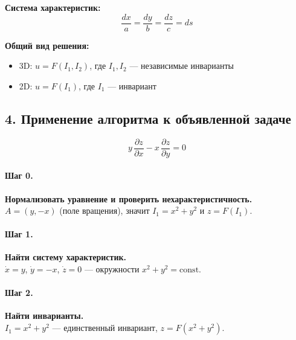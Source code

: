 \textbf{Система характеристик:}
\[
\frac{dx}{a}=\frac{dy}{b}=\frac{dz}{c}=ds
\]

\textbf{Общий вид решения:}
\begin{itemize}
\item 3D: \(u=F(I_1,I_2)\), где \(I_1,I_2\) — независимые инварианты
\item 2D: \(u=F(I_1)\), где \(I_1\) — инвариант
\end{itemize}

\subsection*{4. Применение алгоритма к объявленной задаче}

\[
y\,\frac{\partial z}{\partial x}-x\,\frac{\partial z}{\partial y}=0
\]

\paragraph{Шаг 0.} \textbf{Нормализовать уравнение и проверить нехарактеристичность.}\\
\(A=(y,-x)\) (поле вращения), значит \(I_1=x^2+y^2\) и \(z=F(I_1)\).

\paragraph{Шаг 1.} \textbf{Найти систему характеристик.}\\
\(\dot x=y\), \(\dot y=-x\), \(\dot z=0\) — окружности \(x^2+y^2=\text{const}\).

\paragraph{Шаг 2.} \textbf{Найти инварианты.}\\
\(I_1=x^2+y^2\) — единственный инвариант, \(z=F(x^2+y^2)\).

